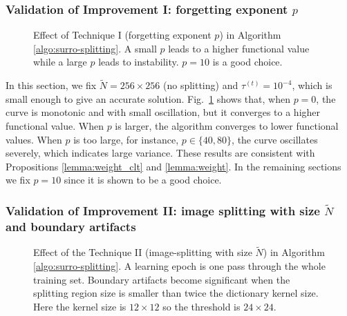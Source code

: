 \documentclass[final]{siamart1116}
\newcommand{\fig}[1]{Fig.~\ref{fig:#1}}
\begin{document}
\subsubsection{Validation of Improvement I: forgetting exponent $p$}
\label{sec:compare_p}

\begin{figure}[t]
\centering \small

\caption{Effect of Technique I (forgetting exponent $p$) in Algorithm \ref{algo:surro-splitting}. A small $p$ leads to a higher functional value
while a large $p$ leads to instability. $p=10$ is a good choice.}
\label{fig:compare_p}
\end{figure}

In this section, we fix $\tilde{N}=256\times256$ (no splitting) and $\tau^{(t)} = 10^{-4}$, which is small enough to give an accurate solution.  \fig{compare_p} shows that, when $p=0$, the curve is monotonic and with small oscillation, but it converges to a higher functional value. When $p$ is larger, the algorithm converges to lower functional values. When $p$ is too large, for instance, $p \in \{40, 80\}$, the curve oscillates severely, which indicates large variance. These results are consistent with Propositions \ref{lemma:weight_clt} and \ref{lemma:weight}.  In the remaining sections we fix $p=10$ since it is shown to be a good choice.


\subsubsection{Validation of Improvement II: image splitting with size $\tilde{N}$ and boundary artifacts}
\label{sec:compare_n}

\begin{figure}[t]
\centering \small

\caption{Effect of the Technique II (image-splitting with size $\tilde{N}$) in Algorithm \ref{algo:surro-splitting}. A learning epoch is one pass through the whole training set. Boundary artifacts become significant when the splitting region size is smaller than twice the dictionary kernel size. Here the kernel size is $12 \times 12$ so the threshold is $24\times24$.}
\label{fig:compare_n}
\end{figure}
\end{document}
